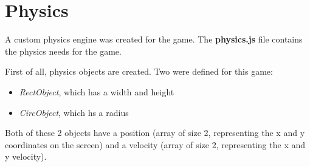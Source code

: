 \chapter{Physics}
A custom physics engine was created for the game. The \textbf{physics.js} file contains the physics needs for the game.

First of all, physics objects are created. Two were defined for this game:
\begin{itemize}
	\item \textit{RectObject}, which has a width and height
	\item \textit{CircObject}, which hs a radius
\end{itemize}
Both of these 2 objects have a position (array of size 2, representing the x and y coordinates on the screen) and a velocity (array of size 2, representing the x and y velocity).

